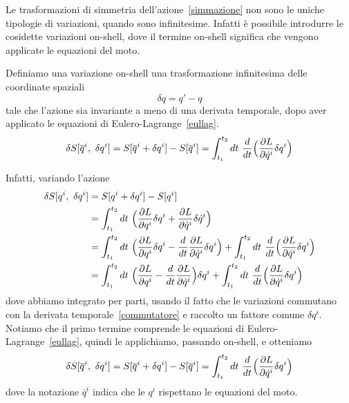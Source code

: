     Le trasformazioni di simmetria dell'azione~\eqref{simmazione} non sono le uniche tipologie di variazioni, quando sono infinitesime. Infatti è possibile introdurre le cosidette variazioni on-shell, dove il termine on-shell significa che vengono applicate le equazioni del moto. 
    \begin{definition}
        Definiamo una variazione on-shell una trasformazione infinitesima delle coordinate spaziali 
    \begin{equation}\label{simmonshell}
        \delta q = q' - q
    \end{equation} 
        tale che l'azione sia invariante a meno di una derivata temporale, dopo aver applicato le equazioni di Eulero-Lagrange~\eqref{eullag}. 
    \begin{equation} \label{invonshell}
        \delta S[\overline q^i,~\delta q^i] = S[\overline q^i + \delta q^i] - S[\overline q^i] = \int_{t_1}^{t_2}dt~ \frac{d}{dt} \Big( \frac{\partial L}{\partial\dot q^i} \delta q^i \Big )
    \end{equation}
    \end{definition}     
    Infatti, variando l'azione
    \begin{equation*}
    \begin{aligned}
        \delta S[q^i,~\delta q^i] & = S[q^i + \delta q^i] - S[q^i] \\ & = \int_{t_1}^{t_2}dt~ \Big( \frac{\partial L}{\partial q^i} \delta q^i + \frac{\partial L}{\partial\dot q^i} \delta \dot q^i \Big) \\ &= \int_{t_1}^{t_2}dt~ \Big( \frac{\partial L}{\partial q^i}  \delta q^i - \frac{d}{dt} \frac{\partial L}{\partial\dot q^i}  \delta q^i \Big )+ \int_{t_1}^{t_2}dt~ \frac{d}{dt} \Big( \frac{\partial L}{\partial\dot q^i} \delta q^i \Big ) \\ & = \int_{t_1}^{t_2}dt~ \Big( \frac{\partial L}{\partial q^i}  - \frac{d}{dt} \frac{\partial L}{\partial\dot q^i} \Big ) \delta q^i + \int_{t_1}^{t_2}dt~ \frac{d}{dt} \Big( \frac{\partial L}{\partial\dot q^i} \delta q^i \Big )
    \end{aligned}
    \end{equation*}
    dove abbiamo integrato per parti, usando il fatto che le variazioni commutano con la derivata temporale~\eqref{commutatore} e raccolto un fattore comune $\delta q^i$. 
    Notiamo che il primo termine comprende le equazioni di Eulero-Lagrange~\eqref{eullag}, quindi le applichiamo, passando on-shell, e otteniamo 
    \begin{equation*} 
        \delta S[\overline q^i,~\delta q^i] = S[\overline q^i + \delta q^i] - S[\overline q^i] = \int_{t_1}^{t_2}dt~ \frac{d}{dt} \Big( \frac{\partial L}{\partial\dot q^i} \delta q^i \Big )
    \end{equation*}
    dove la notazione $\overline q^i$ indica che le $q^i$ rispettano le equazioni del moto. 

